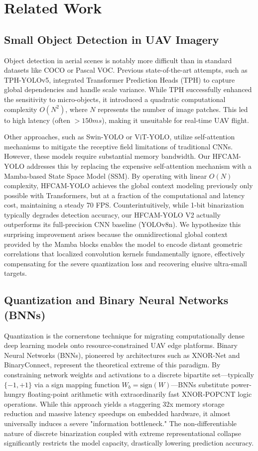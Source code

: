 \documentclass[journal]{IEEEtran}
\begin{document}
\section{Related Work}

\subsection{Small Object Detection in UAV Imagery}
Object detection in aerial scenes is notably more difficult than in standard datasets like COCO or Pascal VOC. Previous state-of-the-art attempts, such as TPH-YOLOv5, integrated Transformer Prediction Heads (TPH) to capture global dependencies and handle scale variance. While TPH successfully enhanced the sensitivity to micro-objects, it introduced a quadratic computational complexity $O(N^2)$, where $N$ represents the number of image patches. This led to high latency (often $>150ms$), making it unsuitable for real-time UAV flight. 

Other approaches, such as Swin-YOLO or ViT-YOLO, utilize self-attention mechanisms to mitigate the receptive field limitations of traditional CNNs. However, these models require substantial memory bandwidth. Our HFCAM-YOLO addresses this by replacing the expensive self-attention mechanism with a Mamba-based State Space Model (SSM). By operating with linear $O(N)$ complexity, HFCAM-YOLO achieves the global context modeling previously only possible with Transformers, but at a fraction of the computational and latency cost, maintaining a steady 70 FPS. Counterintuitively, while 1-bit binarization typically degrades detection accuracy, our HFCAM-YOLO V2 actually outperforms its full-precision CNN baseline (YOLOv8n). We hypothesize this surprising improvement arises because the omnidirectional global context provided by the Mamba blocks enables the model to encode distant geometric correlations that localized convolution kernels fundamentally ignore, effectively compensating for the severe quantization loss and recovering elusive ultra-small targets.


\subsection{Quantization and Binary Neural Networks (BNNs)}
Quantization is the cornerstone technique for migrating computationally dense deep learning models onto resource-constrained UAV edge platforms. Binary Neural Networks (BNNs), pioneered by architectures such as XNOR-Net and BinaryConnect, represent the theoretical extreme of this paradigm. By constraining network weights and activations to a discrete bipartite set—typically $\{-1, +1\}$ via a sign mapping function $W_b = \text{sign}(W)$—BNNs substitute power-hungry floating-point arithmetic with extraordinarily fast XNOR-POPCNT logic operations. While this approach yields a staggering 32x memory storage reduction and massive latency speedups on embedded hardware, it almost universally induces a severe "information bottleneck." The non-differentiable nature of discrete binarization coupled with extreme representational collapse significantly restricts the model capacity, drastically lowering prediction accuracy.
\end{document}
